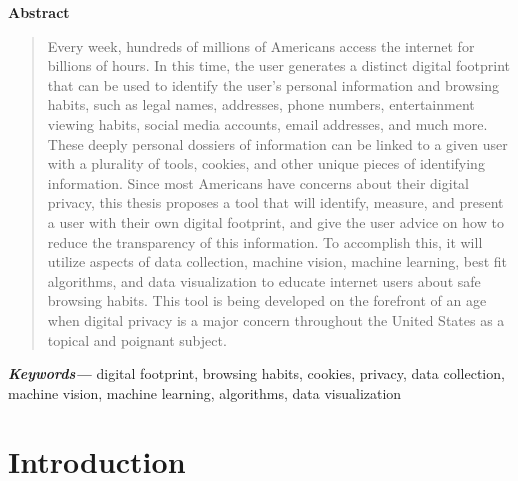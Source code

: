 \documentclass[11pt]{article}
\providecommand{\keywords}[1]{\textbf{\textit{Keywords---}} #1}
\begin{document}
\begin{center}
\large\bf Abstract
\vspace{-1em}  %
\end{center}


\begin{quote}
Every week, hundreds of millions of Americans access the internet for billions of hours. In this time, the user generates a distinct digital footprint that can be used to identify the user's personal information and browsing habits, such as legal names, addresses, phone numbers, entertainment viewing habits, social media accounts, email addresses, and much more. These deeply personal dossiers of information can be linked to a given user with a plurality of tools, cookies, and other unique pieces of identifying information. Since most Americans have concerns about their digital privacy, this thesis proposes a tool that will identify, measure, and present a user with their own digital footprint, and give the user advice on how to reduce the transparency of this information. To accomplish this, it will utilize aspects of data collection, machine vision, machine learning, best fit algorithms, and data visualization to educate internet users about safe browsing habits. This tool is being developed on the forefront of an age when digital privacy is a major concern throughout the United States as a topical and poignant subject.
\end{quote}
\keywords{digital footprint, browsing habits, cookies, privacy, data collection, machine vision, machine learning, algorithms, data visualization}
\section{Introduction}
\label{sec:introduction}
\vspace*{-.1in}

\end{document}
